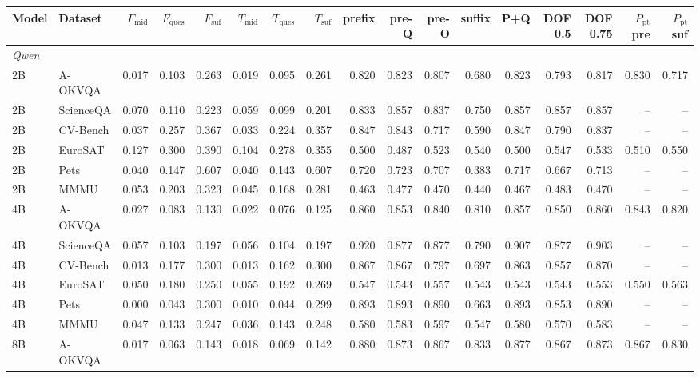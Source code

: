 \begin{tabular}{llrrrrrr rrrr rrrrr}
\toprule
Model & Dataset & $F_{\mathrm{mid}}$ & $F_{\mathrm{ques}}$ & $F_{\mathrm{suf}}$ & $T_{\mathrm{mid}}$ & $T_{\mathrm{ques}}$ & $T_{\mathrm{suf}}$ & prefix & pre-Q & pre-O & suffix & P+Q & DOF 0.5 & DOF 0.75 & $P_{\mathrm{pt}}$ pre & $P_{\mathrm{pt}}$ suf \\
\midrule
\multicolumn{17}{l}{\textit{Qwen}} \\
2B & A-OKVQA & 0.017 & 0.103 & 0.263 & 0.019 & 0.095 & 0.261 & 0.820 & 0.823 & 0.807 & 0.680 & 0.823 & 0.793 & 0.817 & 0.830 & 0.717 \\
2B & ScienceQA & 0.070 & 0.110 & 0.223 & 0.059 & 0.099 & 0.201 & 0.833 & 0.857 & 0.837 & 0.750 & 0.857 & 0.857 & 0.857 & -- & -- \\
2B & CV-Bench & 0.037 & 0.257 & 0.367 & 0.033 & 0.224 & 0.357 & 0.847 & 0.843 & 0.717 & 0.590 & 0.847 & 0.790 & 0.837 & -- & -- \\
2B & EuroSAT & 0.127 & 0.300 & 0.390 & 0.104 & 0.278 & 0.355 & 0.500 & 0.487 & 0.523 & 0.540 & 0.500 & 0.547 & 0.533 & 0.510 & 0.550 \\
2B & Pets & 0.040 & 0.147 & 0.607 & 0.040 & 0.143 & 0.607 & 0.720 & 0.723 & 0.707 & 0.383 & 0.717 & 0.667 & 0.713 & -- & -- \\
2B & MMMU & 0.053 & 0.203 & 0.323 & 0.045 & 0.168 & 0.281 & 0.463 & 0.477 & 0.470 & 0.440 & 0.467 & 0.483 & 0.470 & -- & -- \\
4B & A-OKVQA & 0.027 & 0.083 & 0.130 & 0.022 & 0.076 & 0.125 & 0.860 & 0.853 & 0.840 & 0.810 & 0.857 & 0.850 & 0.860 & 0.843 & 0.820 \\
4B & ScienceQA & 0.057 & 0.103 & 0.197 & 0.056 & 0.104 & 0.197 & 0.920 & 0.877 & 0.877 & 0.790 & 0.907 & 0.877 & 0.903 & -- & -- \\
4B & CV-Bench & 0.013 & 0.177 & 0.300 & 0.013 & 0.162 & 0.300 & 0.867 & 0.867 & 0.797 & 0.697 & 0.863 & 0.857 & 0.870 & -- & -- \\
4B & EuroSAT & 0.050 & 0.180 & 0.250 & 0.055 & 0.192 & 0.269 & 0.547 & 0.543 & 0.557 & 0.543 & 0.543 & 0.543 & 0.553 & 0.550 & 0.563 \\
4B & Pets & 0.000 & 0.043 & 0.300 & 0.010 & 0.044 & 0.299 & 0.893 & 0.893 & 0.890 & 0.663 & 0.893 & 0.853 & 0.890 & -- & -- \\
4B & MMMU & 0.047 & 0.133 & 0.247 & 0.036 & 0.143 & 0.248 & 0.580 & 0.583 & 0.597 & 0.547 & 0.580 & 0.570 & 0.583 & -- & -- \\
8B & A-OKVQA & 0.017 & 0.063 & 0.143 & 0.018 & 0.069 & 0.142 & 0.880 & 0.873 & 0.867 & 0.833 & 0.877 & 0.867 & 0.873 & 0.867 & 0.830 \\

\end{tabular}

